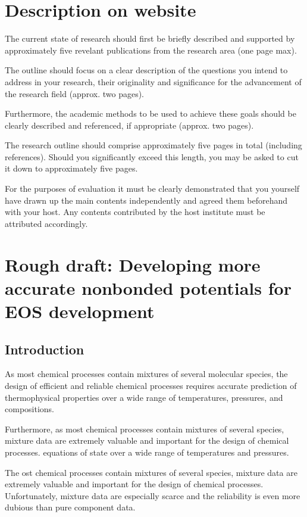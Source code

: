 \documentclass[11pt,a4paper]{article}
\begin{document}
\section{Description on website}

The current state of research should first be briefly described and supported by approximately five revelant publications from the research area (one page max).

The outline should focus on a clear description of the questions you intend to address in your research, their originality and significance for the advancement of the research field (approx. two pages).

Furthermore, the academic methods to be used to achieve these goals should be clearly described and referenced, if appropriate (approx. two pages).

The research outline should comprise approximately five pages in total (including references). Should you significantly exceed this length, you may be asked to cut it down to approximately five pages.

For the purposes of evaluation it must be clearly demonstrated that you yourself have drawn up the main contents independently and agreed them beforehand with your host. Any contents contributed by the host institute must be attributed accordingly.

\section{Rough draft: Developing more accurate nonbonded potentials for EOS development}

\subsection{Introduction}

As most chemical processes contain mixtures of several molecular species, the design of efficient and reliable chemical processes requires accurate prediction of thermophysical properties over a wide range of temperatures, pressures, and compositions. 

 Furthermore, as most chemical processes contain mixtures of several species, mixture data are extremely valuable and important for the design of chemical processes.  equations of state over a wide range of temperatures and pressures.

The ost chemical processes contain mixtures of several species, mixture data are extremely valuable and important for the design of chemical processes. Unfortunately, mixture data are especially scarce and the reliability is even more dubious than pure component data.
\end{document}
